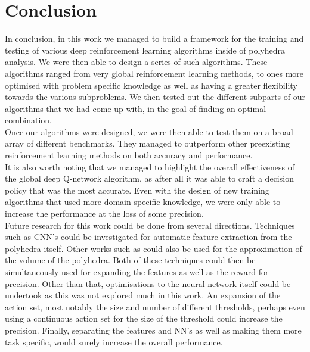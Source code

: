 
\chapter{Conclusion}
In conclusion, in this work we managed to build a framework for the training and testing of various deep reinforcement learning algorithms inside of polyhedra analysis. We were then able to design a series of such algorithms. These algorithms ranged from very global reinforcement learning methods, to ones more optimised with problem specific knowledge as well as having a greater flexibility towards the various subproblems. We then tested out the different subparts of our algorithms that we had come up with, in the goal of finding an optimal combination.\\
Once our algorithms were designed, we were then able to test them on a broad array of different benchmarks. They managed to outperform other preexisting reinforcement learning methods on both accuracy and performance.\\
It is also worth noting that we managed to highlight the overall effectiveness of the global deep Q-network algorithm, as after all it was able to craft a decision policy that was the most accurate. Even with the design of new training algorithms that used more domain specific knowledge, we were only able to increase the performance at the loss of some precision.\\
Future research for this work could be done from several directions. Techniques such as CNN's could be investigated for automatic feature extraction from the polyhedra itself. Other works such as \cite{dyer1991random, kim2004fast} could also be used for the approximation of the volume of the polyhedra. Both of these techniques could then be simultaneously used for expanding the features as well as the reward for precision. Other than that, optimisations to the neural network itself could be undertook as this was not explored much in this work. An expansion of the action set, most notably the size and number of different thresholds, perhaps even using a continuous action set for the size of the threshold could increase the precision. Finally, separating the features and NN's as well as making them more task specific, would surely increase the overall performance. 
